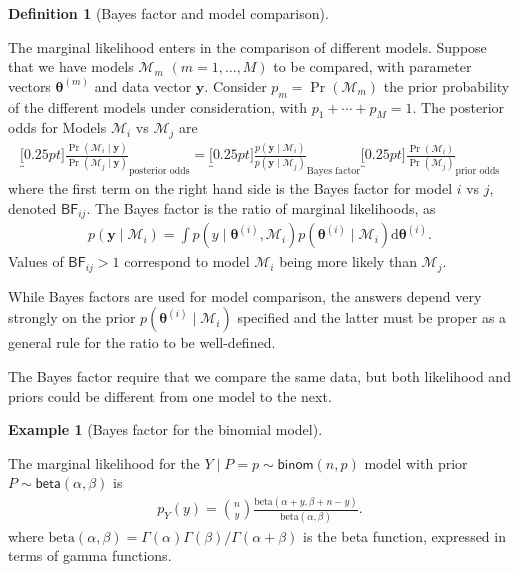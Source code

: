 \documentclass[
  11pt,
  letterpaper,
]{scrbook}
\theoremstyle{definition}
\newtheorem{example}{Example}[chapter]
\theoremstyle{plain}
\theoremstyle{plain}
\theoremstyle{plain}
\theoremstyle{definition}
\theoremstyle{definition}
\newtheorem{definition}{Definition}[chapter]
\theoremstyle{plain}
\theoremstyle{plain}
\theoremstyle{remark}
\begin{document}
\begin{definition}[Bayes factor and model
comparison]\protect\hypertarget{def-bayes-factor}{}\label{def-bayes-factor}

The marginal likelihood enters in the comparison of different models.
Suppose that we have models \(\mathcal{M}_m\) \((m=1, \ldots, M)\) to be
compared, with parameter vectors \(\boldsymbol{\theta}^{(m)}\) and data
vector \(\boldsymbol{y}.\) Consider \(p_m =\Pr(\mathcal{M}_m)\) the
prior probability of the different models under consideration, with
\(p_1 + \cdots + p_M = 1.\) The posterior odds for Models
\(\mathcal{M}_i\) vs \(\mathcal{M}_j\) are \begin{align*}
\underbracket[0.25pt]{\frac{\Pr(\mathcal{M}_i \mid \boldsymbol{y})}{\Pr(\mathcal{M}_j \mid \boldsymbol{y})}}_{\text{posterior odds}} = \underbracket[0.25pt]{\frac{p(\boldsymbol{y} \mid \mathcal{M}_i)}{p(\boldsymbol{y} \mid \mathcal{M}_j)}}_{\text{Bayes factor}} \underbracket[0.25pt]{\frac{\Pr(\mathcal{M}_i)}{\Pr(\mathcal{M}_j)}}_{\text{prior odds}}
\end{align*} where the first term on the right hand side is the Bayes
factor for model \(i\) vs \(j,\) denoted \(\mathsf{BF}_{ij}.\) The Bayes
factor is the ratio of marginal likelihoods, as \begin{align*}
p(\boldsymbol{y} \mid \mathcal{M}_i) = \int p(y \mid \boldsymbol{\theta}^{(i)}, \mathcal{M}_i) p( \boldsymbol{\theta}^{(i)} \mid \mathcal{M}_i) \mathrm{d}  \boldsymbol{\theta}^{(i)}.
\end{align*} Values of \(\mathsf{BF}_{ij}>1\) correspond to model
\(\mathcal{M}_i\) being more likely than \(\mathcal{M}_j.\)

While Bayes factors are used for model comparison, the answers depend
very strongly on the prior
\(p( \boldsymbol{\theta}^{(i)} \mid \mathcal{M}_i)\) specified and the
latter must be proper as a general rule for the ratio to be
well-defined.

The Bayes factor require that we compare the same data, but both
likelihood and priors could be different from one model to the next.

\end{definition}

\begin{example}[Bayes factor for the binomial
model]\protect\hypertarget{exm-bayesfactor}{}\label{exm-bayesfactor}

The marginal likelihood for the \(Y \mid P=p \sim \mathsf{binom}(n,p)\)
model with prior \(P \sim \mathsf{beta}(\alpha, \beta)\) is
\begin{align*}
p_{Y}(y) = \binom{n}{y} \frac{\mathrm{beta}(\alpha + y, \beta + n - y)}{\mathrm{beta}(\alpha, \beta)}.
\end{align*} where
\(\mathrm{beta}(\alpha, \beta) = \Gamma(\alpha)\Gamma(\beta)/\Gamma(\alpha+\beta)\)
is the beta function, expressed in terms of gamma functions.

\end{example}
\end{document}

